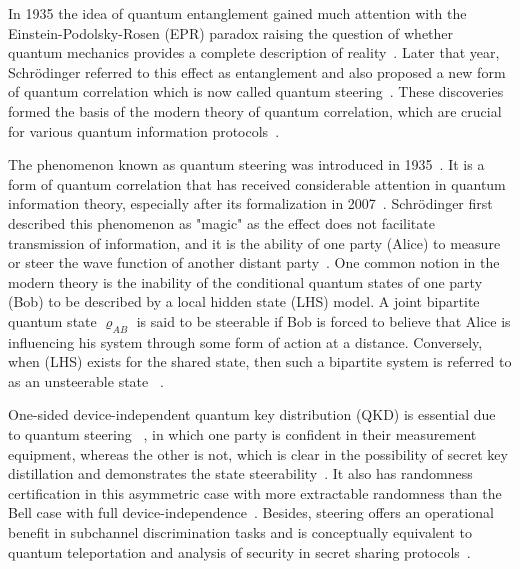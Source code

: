 In 1935 the idea of quantum entanglement gained much attention with the Einstein-Podolsky-Rosen (EPR) paradox raising the question of whether quantum mechanics provides a complete description of reality~\cite{EinsteinPodolskyRosen1935}. Later that year, Schr\"{o}dinger referred to this effect as entanglement and also proposed a new form of quantum correlation which is now called quantum steering~\cite{Schrodinger1935,Uola2020}. These discoveries formed the basis of the modern theory of quantum correlation, which are crucial for  various quantum information protocols~\cite{Horodecki2009,NielsenChuang2000}.

The phenomenon known as quantum steering was introduced in 1935~\cite{Schrodinger1935}. It is a form of quantum correlation that has received considerable attention in quantum information theory, especially after its formalization in 2007~\cite{WisemanJonesDoherty2007}. Schr\"{o}dinger first described this phenomenon as "magic" as the effect does not facilitate transmission of information, and it is the ability of one party (Alice) to measure or steer the wave function of another distant party~\cite{Uola2020}.
One common notion in the modern theory is the inability of the conditional quantum states of one party (Bob) to be described by a local hidden state (LHS) model. A joint bipartite quantum state $\varrho_{AB}$ 
is said to be steerable if Bob is forced to believe that Alice is influencing his system through some form of action at a distance. Conversely, when (LHS) exists for the shared state, then such a bipartite system is referred to as an unsteerable state
~\cite{Uola2020}.

One-sided device-independent quantum key distribution (QKD) is essential due to quantum steering~\cite{Branciard2012QKD}
, in which one party is confident in their measurement equipment, whereas the other is not, which is clear in the possibility of secret key distillation and demonstrates the state steerability~\cite{Branciard2012QKD,Uola2020}. It also has randomness certification in this asymmetric case with more extractable randomness than the Bell case with full device-independence~\cite{Law2014}. Besides, steering offers an operational benefit in subchannel discrimination tasks and is conceptually equivalent to quantum teleportation and analysis of security in secret sharing protocols~\cite{PianiWatrous2015,Uola2020}.


